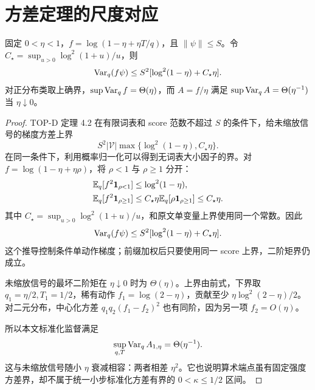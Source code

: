 \section{方差定理的尺度对应}
\begin{theorem}[算术监督的方差界与小步尺度]
固定 $0<\eta<1$，$f=\log(1-\eta+\eta T/q)$，且 $\|\psi\|\le S$。令 $C_\star=\sup_{u>0}\log^2(1+u)/u$，则
\begin{equation}
\operatorname{Var}_q(f\psi)\le S^2[\log^2(1-\eta)+C_\star\eta].
\end{equation}
对正分布类取上确界，$\sup\operatorname{Var}_qf=\Theta(\eta)$，而 $A=f/\eta$ 满足 $\sup\operatorname{Var}_qA=\Theta(\eta^{-1})$ 当 $\eta\downarrow0$。
\end{theorem}
\begin{proof}
TOP-D 定理 4.2 在有限词表和 score 范数不超过 $S$ 的条件下，给未缩放信号的梯度方差上界
\begin{equation}
S^2|\mathcal V|\max\{\log^2(1-\eta),C_\star\eta\}.
\end{equation}
在同一条件下，利用概率归一化可以得到无词表大小因子的界。对 $f=\log(1-\eta+\eta\rho)$，将 $\rho<1$ 与 $\rho\ge1$ 分开：
\begin{align}
\mathbb E_q[f^2\mathbf1_{\rho<1}]&\le\log^2(1-\eta),\\
\mathbb E_q[f^2\mathbf1_{\rho\ge1}]
&\le C_\star\eta\mathbb E_q[\rho\mathbf1_{\rho\ge1}]
\le C_\star\eta.
\end{align}
其中 $C_\star=\sup_{u>0}\log^2(1+u)/u$，和原文单变量上界使用同一个常数。因此
\begin{equation}
\operatorname{Var}_q(f\psi)\le S^2[\log^2(1-\eta)+C_\star\eta].
\end{equation}
这个推导控制条件单动作梯度；前缀加权后只要使用同一 score 上界，二阶矩界仍成立。

未缩放信号的最坏二阶矩在 $\eta\downarrow0$ 时为 $\Theta(\eta)$。上界由前式，下界取 $q_1=\eta/2,T_1=1/2$，稀有动作 $f_1=\log(2-\eta)$，贡献至少 $\eta\log^2(2-\eta)/2$。对二元分布，中心化方差 $q_1q_2(f_1-f_2)^2$ 也有同阶，因为另一项 $f_2=O(\eta)$。

所以本文标准化监督满足
\begin{equation}
\sup_{q,T}\operatorname{Var}_qA_{1,\eta}=\Theta(\eta^{-1}).
\end{equation}
这与未缩放信号随小 $\eta$ 衰减相容：两者相差 $\eta^2$。它也说明算术端点虽有固定强度方差界，却不属于统一小步标准化方差有界的 $0<\kappa\le1/2$ 区间。
\end{proof}

